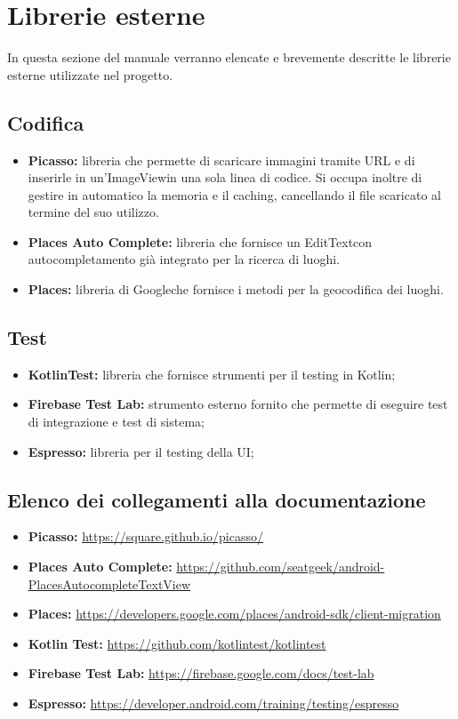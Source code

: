 \section{Librerie esterne}
In questa sezione del manuale verranno elencate e brevemente descritte le librerie esterne utilizzate nel progetto.
\subsection{Codifica}
\begin{itemize}
	\item \textbf{Picasso:} libreria che permette di scaricare immagini tramite URL e di inserirle in un'ImageView\glosp in una sola linea di codice. Si occupa inoltre di gestire in automatico la memoria e il caching, cancellando il file scaricato al termine del suo utilizzo.
	\item \textbf{Places Auto Complete:} libreria che fornisce un EditText\glosp con autocompletamento già integrato per la ricerca di luoghi.
	\item \textbf{Places:} libreria di Google\glosp che fornisce i metodi per la geocodifica dei luoghi.
\end{itemize}
\subsection{Test}
\begin{itemize}
	\item \textbf{KotlinTest:} libreria che fornisce strumenti per il testing in Kotlin\glo;
	\item \textbf{Firebase Test Lab:} strumento esterno fornito che permette di eseguire
	test di integrazione e test di sistema;

	\item \textbf{Espresso:} libreria per il testing della UI;
\end{itemize}
\subsection{Elenco dei collegamenti alla documentazione}
\begin{itemize}
	\item \textbf{Picasso:} \url{https://square.github.io/picasso/}
	\item \textbf{Places Auto Complete:}
	\url{https://github.com/seatgeek/android-PlacesAutocompleteTextView}
	\item \textbf{Places:}
	\url{https://developers.google.com/places/android-sdk/client-migration}
	\item \textbf{Kotlin Test:}
	\url{https://github.com/kotlintest/kotlintest}
	\item \textbf{Firebase Test Lab:}
	\url{https://firebase.google.com/docs/test-lab}
	\item \textbf{Espresso:}
	\url{https://developer.android.com/training/testing/espresso}
\end{itemize}
